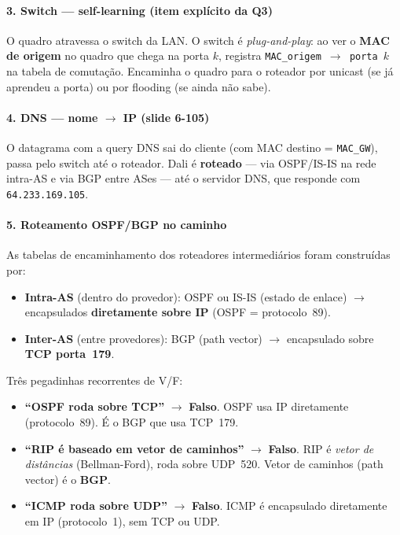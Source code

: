 \documentclass[11pt,a4paper]{article}
\begin{document}
\paragraph{3. Switch --- self-learning (item explícito da Q3)}

O quadro atravessa o switch da LAN. O switch é \textit{plug-and-play}: ao ver o \textbf{MAC de origem} no quadro que chega na porta $k$, registra \texttt{MAC\_origem $\to$ porta $k$} na tabela de comutação. Encaminha o quadro para o roteador por unicast (se já aprendeu a porta) ou por flooding (se ainda não sabe).

\paragraph{4. DNS --- nome $\to$ IP (slide 6-105)}

O datagrama com a query DNS sai do cliente (com MAC destino = \texttt{MAC\_GW}), passa pelo switch até o roteador. Dali é \textbf{roteado} --- via OSPF/IS-IS na rede intra-AS e via BGP entre ASes --- até o servidor DNS, que responde com \texttt{64.233.169.105}.

\paragraph{5. Roteamento OSPF/BGP no caminho}

As tabelas de encaminhamento dos roteadores intermediários foram construídas por:
\begin{itemize}[noitemsep]
    \item \textbf{Intra-AS} (dentro do provedor): OSPF ou IS-IS (estado de enlace) $\to$ encapsulados \textbf{diretamente sobre IP} (OSPF = protocolo~89).
    \item \textbf{Inter-AS} (entre provedores): BGP (path vector) $\to$ encapsulado sobre \textbf{TCP porta~179}.
\end{itemize}

\begin{prova}
Três pegadinhas recorrentes de V/F:
\begin{itemize}[noitemsep]
    \item \textbf{``OSPF roda sobre TCP''} $\to$ \textbf{Falso}. OSPF usa IP diretamente (protocolo~89). É o BGP que usa TCP~179.
    \item \textbf{``RIP é baseado em vetor de caminhos''}  $\to$ \textbf{Falso}. RIP é \emph{vetor de distâncias} (Bellman-Ford), roda sobre UDP~520. Vetor de caminhos (path vector) é o \textbf{BGP}.
    \item \textbf{``ICMP roda sobre UDP''} $\to$ \textbf{Falso}. ICMP é encapsulado diretamente em IP (protocolo~1), sem TCP ou UDP.
\end{itemize}
\end{prova}
\end{document}
